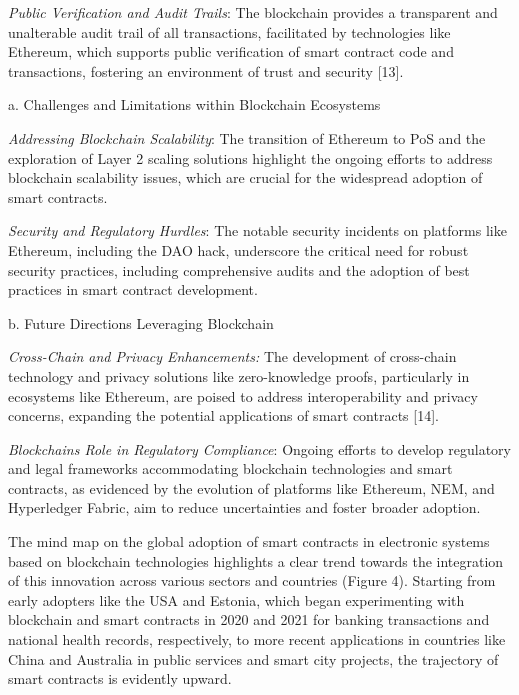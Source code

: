 \emph{Public Verification and Audit Trails}: The blockchain provides a
transparent and unalterable audit trail of all transactions, facilitated
by technologies like Ethereum, which supports public verification of
smart contract code and transactions, fostering an environment of trust
and security {[}13{]}.

a. Challenges and Limitations within Blockchain Ecosystems

\emph{Addressing Blockchain Scalability}: The transition of Ethereum to
PoS and the exploration of Layer 2 scaling solutions highlight the
ongoing efforts to address blockchain scalability issues, which are
crucial for the widespread adoption of smart contracts.

\emph{Security and Regulatory Hurdles}: The notable security incidents
on platforms like Ethereum, including the DAO hack, underscore the
critical need for robust security practices, including comprehensive
audits and the adoption of best practices in smart contract development.

b. Future Directions Leveraging Blockchain

\emph{Cross-Chain and Privacy Enhancements:} The development of
cross-chain technology and privacy solutions like zero-knowledge proofs,
particularly in ecosystems like Ethereum, are poised to address
interoperability and privacy concerns, expanding the potential
applications of smart contracts {[}14{]}.

\emph{Blockchain\textquotesingle s Role in Regulatory Compliance}:
Ongoing efforts to develop regulatory and legal frameworks accommodating
blockchain technologies and smart contracts, as evidenced by the
evolution of platforms like Ethereum, NEM, and Hyperledger Fabric, aim
to reduce uncertainties and foster broader adoption.

The mind map on the global adoption of smart contracts in electronic
systems based on blockchain technologies highlights a clear trend
towards the integration of this innovation across various sectors and
countries (Figure 4). Starting from early adopters like the USA and
Estonia, which began experimenting with blockchain and smart contracts
in 2020 and 2021 for banking transactions and national health records,
respectively, to more recent applications in countries like China and
Australia in public services and smart city projects, the trajectory of
smart contracts is evidently upward.

